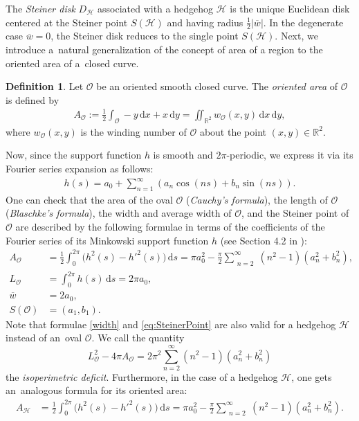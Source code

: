 \documentclass{amsart}
\theoremstyle{definition}
\newtheorem{defn}[thm]{Definition}
\numberwithin{equation}{section}
\renewcommand{\d}{\mathrm{d}}
\begin{document}
The \textit{Steiner disk} $D_{\mathcal{H}}$ associated with a hedgehog $\mathcal{H}$ is the unique Euclidean disk centered at the Steiner point $S(\mathcal{H})$ and having radius $\frac{1}{2}\left|\overline{w}\right|$. In the degenerate case $\overline{w}=0$, the Steiner disk reduces to the single point $S(\mathcal{H})$.
Next, we introduce a~natural generalization of the concept of area of a region to the oriented area of a~closed curve.
\begin{defn}
Let $\mathcal{O}$ be an oriented smooth closed curve. The \textit{oriented area} of $\mathcal{O}$ is defined by
\begin{align*}
A_\mathcal{O}:=\frac{1}{2}\int_\mathcal{O}-y\,\d x+x\,\d y=\iint_{\mathbb{R}^2}w_\mathcal{O}(x,y)\,\d x\,\d y,
\end{align*}
where $w_\mathcal{O}(x,y)$ is the winding number of $\mathcal{O}$ about the point $(x,y)\in\mathbb{R}^2$.
\end{defn}

Now, since the support function $h$ is smooth and $2\pi$-periodic, we express it via its Fourier series expansion as follows:
\begin{align*}
    h(s)=a_0+\sum_{n=1}^{\infty}\left(a_n\cos \left(ns\right)+b_n\sin \left(ns\right)\right).
\end{align*}
One can check that the area of the oval $\mathcal{O}$ (\textit{Cauchy's formula}), the length of $\mathcal{O}$ (\textit{Blaschke's formula}), the width and average width of $\mathcal{O}$, and the Steiner point of $\mathcal{O}$ are described by the following formulae in terms of the coefficients of the Fourier series of its Minkowski support function $h$ (see Section 4.2 in \cite{G4}):
\begin{align}
\label{OAreaFourier}A_\mathcal{O} &=\frac{1}{2}\int_0^{2\pi}\Big(h^2(s)-h'^2(s)\Big)\,\d s=\pi a_0^2-\frac{\pi}{2}\sum_{\substack{n=2}}^{\infty}(n^2-1)(a_n^2+b_n^2),\\
\label{LengthFourier}L_\mathcal{O} &=\int_0^{2\pi}h(s)\,\d s =2\pi a_0,\\
\label{width} \overline{w} & = 2a_0, \\
\label{eq:SteinerPoint}S(\mathcal{O})&=(a_1,b_1).
\end{align}
Note that formulae \eqref{width} and \eqref{eq:SteinerPoint} are also valid
for a hedgehog $\mathcal{H}$ instead of an~oval $\mathcal{O}$.
We call the quantity 
\begin{equation}\label{isdef}
    L^2_\mathcal{O} - 4\pi A_\mathcal{O} = 2\pi^2\sum_{n=2}^{\infty}(n^2-1)(a_n^2 + b_n^2) 
\end{equation}
the \textit{isoperimetric deficit}.
Furthermore, in the case of a hedgehog $\mathcal{H}$, one gets an~analogous formula for its oriented area:
\begin{align}
\label{HAreaFourier}A_\mathcal{H} &=\frac{1}{2}\int_0^{2\pi}\Big(h^2(s)-h'^2(s)\Big)\,\d s=\pi a_0^2-\frac{\pi}{2}\sum_{\substack{n=2}}^{\infty}(n^2-1)(a_n^2+b_n^2).
\end{align}
\end{document}
